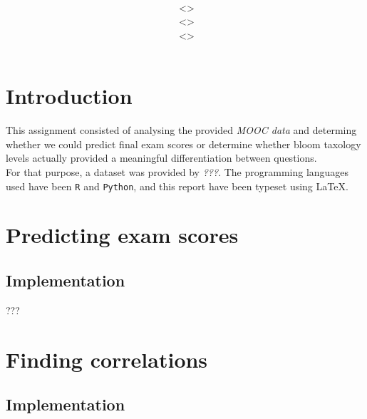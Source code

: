 \documentclass[12pt,a4paper]{article}
\title{\vspace{2in}\textmd{\hmwkClass\\\textbf{\hmwkTitle}}\\\normalsize\vspace{0.1in}\small{\hmwkDueDate}\\\vspace{4in}}
\date{}
\author{\textbf{\hmwkAuthorNameA} $\;$<\texttt{\href{mailto:laane2@illinois.edu}{\hmwkAuthorEmailA}}>\\\textbf{\hmwkAuthorNameB} $\;$<\texttt{\href{mailto:ruizcep2@illinois.edu}{\hmwkAuthorEmailB}}>\\\textbf{\hmwkAuthorNameC} $\;$<\texttt{\href{mailto:njeffre2@illinois.edu}{\hmwkAuthorEmailC}}>}
\begin{document}
\begin{singlespace}

\begin{titlepage}
\maketitle
\thispagestyle{empty}
\end{titlepage}

\tableofcontents
\newpage


\clearpage

\section{Introduction}
This assignment consisted of analysing the provided \emph{MOOC data} and determing whether we could predict final exam scores or determine whether bloom taxology levels actually provided a meaningful differentiation between questions. \\

For that purpose, a dataset was provided by \emph{???}. The programming languages used have been \texttt{R} and \texttt{Python}, and this report have been typeset using \LaTeX.

\section{Predicting exam scores}
\subsection{Implementation}
???

\section{Finding correlations}
\subsection{Implementation}


\newpage

\end{singlespace}
\end{document}
